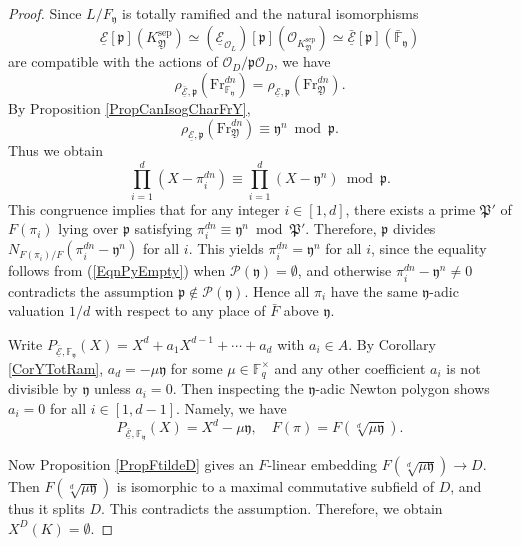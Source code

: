 \documentclass[10pt]{amsart}
\theoremstyle{plain}
\theoremstyle{definition}
\newcommand{\Fr}{\mathrm{Fr}}
\newcommand{\sep}{\mathrm{sep}}
\newcommand{\cO}{\mathcal{O}}
\newcommand{\cP}{\mathcal{P}}
\newcommand{\ucE}{\underline{\mathcal{E}}}
\newcommand{\bF}{\mathbb{F}}
\newcommand{\frP}{\mathfrak{P}}
\newcommand{\frp}{\mathfrak{p}}
\newcommand{\frY}{\mathfrak{Y}}
\newcommand{\fry}{\mathfrak{y}}
\begin{document}
\begin{proof}
	Since $L/F_\fry$ is totally ramified and the natural isomorphisms
	\[
	\ucE[\frp](K_{\frY}^\sep)\simeq (\ucE_{\cO_L})[\frp](\cO_{K_{\frY}^\sep})\simeq \bar{\ucE}[\frp](\bar{\bF}_\fry)
	\]
	are compatible with the actions of $\cO_D/\frp\cO_D$, we have 
	\[
	\rho_{\bar{\ucE},\frp}(\Fr_{\bF_\fry}^{dn})=\rho_{\ucE,\frp}(\Fr_{\frY}^{dn}).
	\]
	By Proposition \ref{PropCanIsogCharFrY}, 
	\[
	\rho_{\ucE,\frp}(\Fr_{\frY}^{dn})\equiv \fry^n\bmod \frp.
	\]
	Thus we obtain
	\[
	\prod_{i=1}^d (X-\pi_i^{dn})\equiv \prod_{i=1}^d (X-\fry^n)\bmod \frp.
	\]
	This congruence implies that for any integer $i\in [1,d]$, 
	there exists a prime $\frP'$ of $F(\pi_i)$ lying over $\frp$ satisfying $\pi_i^{dn}\equiv \fry^n \bmod \frP'$.
	Therefore, $\frp$ divides $N_{F(\pi_i)/F}(\pi_i^{dn}-\fry^n)$ for all $i$. 
	This yields $\pi_i^{dn}=\fry^n$ for all $i$, since the equality follows from (\ref{EqnPyEmpty}) when $\cP(\fry)=\emptyset$,
	and otherwise $\pi_i^{dn}-\fry^n\neq 0$ contradicts the assumption $\frp\notin \cP(\fry)$.
	Hence all $\pi_i$ have the same $\fry$-adic valuation $1/d$ with respect to any place of $\bar{F}$ above $\fry$.
	
	Write $P_{\bar{\ucE},\bF_\fry}(X)=X^d+a_1X^{d-1}+\cdots+a_d$ with $a_i\in A$. By Corollary \ref{CorYTotRam}, 
	$a_d=-\mu\fry$ for some $\mu\in \bF_q^\times$ and any other coefficient $a_i$ is not divisible by $\fry$ unless $a_i=0$.
	Then inspecting the $\fry$-adic Newton polygon shows $a_i=0$ for all $i\in [1,d-1]$. Namely, we have
	\[
	P_{\bar{\ucE},\bF_\fry}(X)=X^d-\mu\fry,\quad F(\pi)=F(\sqrt[d]{\mu\fry}).
	\]
	
	Now Proposition \ref{PropFtildeD} gives an $F$-linear embedding $F(\sqrt[d]{\mu\fry})\to D$.
	Then $F(\sqrt[d]{\mu\fry})$ is isomorphic to a maximal commutative subfield of $D$, and thus
	it splits $D$. This contradicts the assumption. Therefore, we obtain $X^D(K)=\emptyset$.
\end{proof}
\end{document}
